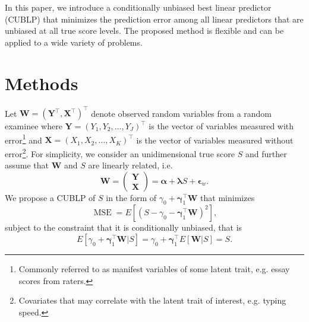 \documentclass[man, floatsintext]{apa7}
\newcommand{\mbf}[1]{\bm{#1}}
\newcommand{\bX}{\mbf{X}}
\newcommand{\bY}{\mbf{Y}}
\newcommand{\bW}{\mbf{W}}
\DeclareMathOperator{\MSE}{MSE}
\begin{document}
  In this paper, we introduce a conditionally unbiased best linear predictor 
  (CUBLP) that minimizes the prediction error among all
  linear predictors that are unbiased at all true score levels. The proposed
  method is flexible and can be applied to a wide variety of problems.

  \section{Methods}
  Let $\bW = (\bY^\top, \bX^\top)^\top$ denote observed random variables
  from a random examinee where $\bY = (Y_1, Y_2, \dots, Y_J)^\top$ is the vector
  of variables measured with error\footnote{Commonly referred to as manifest
  variables of some latent trait, e.g. essay scores from raters.}
  and $\bX = (X_1, X_2, \dots, X_K)^\top$ is the vector of variables measured
  without error\footnote{Covariates that may correlate with the latent
  trait of interest, e.g. typing speed.}. For simplicity, we consider an
  unidimensional true score $S$ and further assume that $\bW$ and $S$ are
  linearly related, i.e.
  \begin{equation}
    \mbf{W} = \left (
      \begin{array}{c} \bY \\  \bX \end{array} \right ) =
    \mbf{\alpha} + \mbf{\lambda} S + \mbf{\epsilon}_w.
  \end{equation}
  We propose a CUBLP of $S$ in the form of $\gamma_0 + \mbf{\gamma}_1^\top 
  \mbf{W}$
  that minimizes
  \begin{equation}
  \label{eq:mse}
    \MSE = E\left [ ( S - \gamma_0 -\mbf{\gamma}_1^\top \mbf{W} )^2 \right],
  \end{equation}
  subject to the constraint that it is conditionally unbiased, that is
  \begin{equation}
  \label{eq:constraint}
    E[ \gamma_0 + \mbf{\gamma}_1^\top \mbf{W} | S ] = \gamma_0 + 
    \mbf{\gamma}_1^\top E[\mbf{W} | S ] = S.
  \end{equation}
\end{document}
